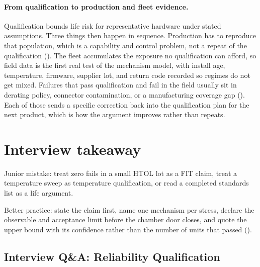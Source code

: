 \paragraph{From qualification to production and fleet evidence.}
Qualification bounds life risk for representative hardware under stated
assumptions. Three things then happen in sequence. Production has to reproduce
that population, which is a capability and control problem, not a repeat of the
qualification (). The fleet accumulates the exposure no
qualification can afford, so field data is the first real test of the
mechanism model, with install age, temperature, firmware, supplier lot, and
return code recorded so regimes do not get mixed. Failures that pass
qualification and fail in the field usually sit in derating policy, connector
contamination, or a manufacturing coverage gap
(). Each of those
sends a specific correction back into the qualification plan for the next
product, which is how the argument improves rather than repeats.

\section{Interview takeaway}
\label{sec:reliability-design-review}


Junior mistake: treat zero fails in a small HTOL lot as a FIT claim, treat a
temperature sweep as temperature qualification, or read a completed standards
list as a life argument.

Better practice: state the claim first, name one mechanism per stress, declare
the observable and acceptance limit before the chamber door closes, and quote
the upper bound with its confidence rather than the number of units that passed
().

\subsection{Interview Q\&A: Reliability Qualification}
\label{sec:reliability-interview-qa}

